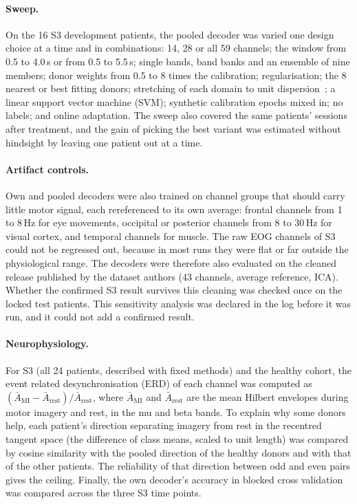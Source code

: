 \documentclass[pdflatex,sn-mathphys-num]{sn-jnl}
\begin{document}
\paragraph{Sweep.} On the 16 S3 development patients, the pooled decoder was varied one design choice at a time and in combinations: 14, 28 or all 59 channels; the window from 0.5 to 4.0\,s or from 0.5 to 5.5\,s; single bands, band banks and an ensemble of nine members; donor weights from 0.5 to 8 times the calibration; regularisation; the 8 nearest or best fitting donors; stretching of each domain to unit dispersion~\cite{rodrigues2019}; a linear support vector machine (SVM); synthetic calibration epochs mixed in; no labels; and online adaptation. The sweep also covered the same patients' sessions after treatment, and the gain of picking the best variant was estimated without hindsight by leaving one patient out at a time.

\paragraph{Artifact controls.} Own and pooled decoders were also trained on channel groups that should carry little motor signal, each rereferenced to its own average: frontal channels from 1 to 8\,Hz for eye movements, occipital or posterior channels from 8 to 30\,Hz for visual cortex, and temporal channels for muscle. The raw EOG channels of S3 could not be regressed out, because in most runs they were flat or far outside the physiological range. The decoders were therefore also evaluated on the cleaned release published by the dataset authors (43 channels, average reference, ICA). Whether the confirmed S3 result survives this cleaning was checked once on the locked test patients. This sensitivity analysis was declared in the log before it was run, and it could not add a confirmed result.

\paragraph{Neurophysiology.} For S3 (all 24 patients, described with fixed methods) and the healthy cohort, the event related desynchronisation (ERD) of each channel was computed as $(\bar A_{\mathrm{MI}} - \bar A_{\mathrm{rest}}) / \bar A_{\mathrm{rest}}$, where $\bar A_{\mathrm{MI}}$ and $\bar A_{\mathrm{rest}}$ are the mean Hilbert envelopes during motor imagery and rest, in the mu and beta bands. To explain why some donors help, each patient's direction separating imagery from rest in the recentred tangent space (the difference of class means, scaled to unit length) was compared by cosine similarity with the pooled direction of the healthy donors and with that of the other patients. The reliability of that direction between odd and even pairs gives the ceiling. Finally, the own decoder's accuracy in blocked cross validation was compared across the three S3 time points.
\end{document}
